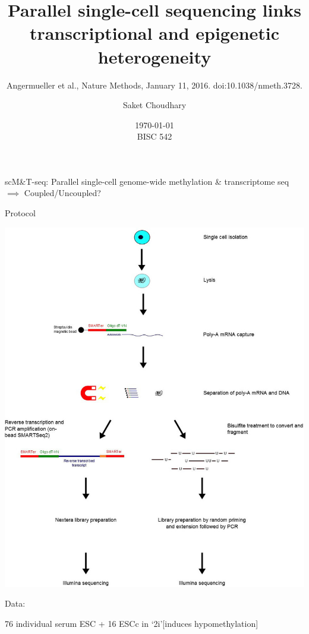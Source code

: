 \documentclass[10pt, compress]{beamer}
\title{Parallel single-cell sequencing links transcriptional and epigenetic heterogeneity
	}
\subtitle{Angermueller et al., Nature Methods, January 11, 2016. doi:10.1038/nmeth.3728.}
\author[skc]{Saket Choudhary}
\date{%
\today \\
BISC 542}
\renewcommand{\(}{\begin{columns}}
\renewcommand{\)}{\end{columns}}
\newcommand{\<}[1]{\begin{column}{#1}}
\renewcommand{\>}{\end{column}}
\begin{document}
\maketitle


\begin{frame}[fragile]
\begin{center}
\Large scM\&T-seq: Parallel single-cell genome-wide methylation \& transcriptome seq\\ 
$\implies$ Coupled/Uncoupled?
\end{center}
\end{frame}

\begin{frame}[fragile]
	\centering \Large Protocol
	\vspace*{-7pt}
	\begin{center}
	\includegraphics[width=\linewidth,height=\textheight,keepaspectratio]{images/protocol}
\end{center}
\end{frame}

\begin{frame}[fragile]
	\begin{center} \Large Data:\end{center}
	76 individual serum ESC + 16 ESCc in `2i'[induces hypomethylation]
\end{frame}
\end{document}
